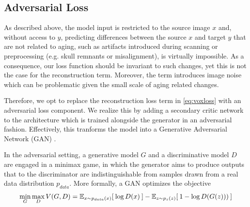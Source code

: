\subsection{Adversarial Loss}

As described above, the model input is restricted to the source image $x$ and, without access to $y$, predicting differences between the source $x$ and target $y$ that are not related to aging, such as artifacts introduced during scanning or preprocessing (e.g. skull remnants or misalignment), is virtually impossible. As a consequence, our loss function should be invariant to such changes, yet this is not the case for the reconstruction term. Moreover, the term introduces image noise which can be problematic given the small scale of aging related changes.


Therefore, we opt to replace the reconstruction loss term in \autoref{eq:voxloss} with an adversarial loss component. We realize this by adding a secondary critic network to the architecture which is trained alongside the generator in an adversarial fashion. Effectively, this tranforms the model into a Generative Adversarial Network (GAN) \cite{goodfellow2014generative}.

In the adversarial setting, a generative model $G$ and a discriminative model $D$ are engaged in a minimax game, in which the generator aims to produce outputs that to the discriminator are indistinguishable from samples drawn from a real data distribution $p_{data}$. More formally, a GAN optimizes the objective
\begin{equation}
	\min_G \max_D V(G, D) = \mathbb{E}_{ x \sim p_{data}(x) } [ \: \log{D (x)} \: ] 
	 - \mathbb{E}_{ z \sim p_z(z) } [ \: 1 - \log{D (G(z))}) \: ]
\end{equation}

